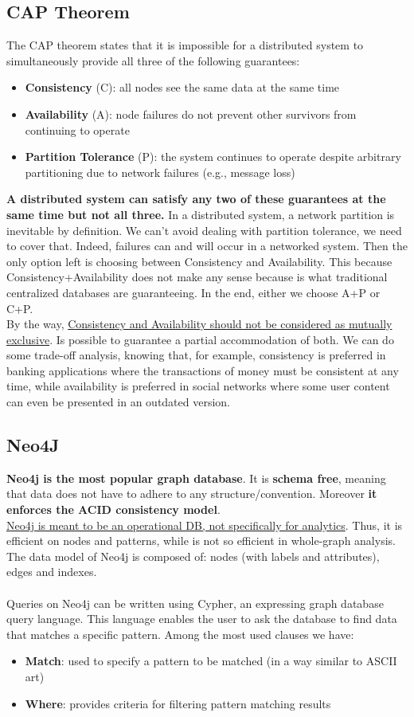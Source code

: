 \documentclass[10pt,a4paper]{article}
\newcommand{\nline}{\\~\\}
\begin{document}
\subsection{CAP Theorem}
The CAP theorem states that it is impossible for a distributed system to simultaneously provide all three of the following guarantees:
\begin{itemize}
	\item \textbf{Consistency} (C): all nodes see the same data at the same time 
	\item \textbf{Availability} (A): node failures do not prevent other survivors from continuing to operate
	\item \textbf{Partition Tolerance} (P): the system continues to operate despite arbitrary partitioning due to network failures (e.g., message loss)
\end{itemize}
\textbf{A distributed system can satisfy any two of these guarantees at the same time but not all three.} In a distributed system, a network partition is inevitable by definition. We can’t avoid dealing with partition tolerance, we need to cover that. Indeed, failures can and will occur in a networked system. Then the only option left is choosing between Consistency and Availability. This because Consistency+Availability does not make any sense because is what traditional centralized databases are guaranteeing. In the end, either we choose A+P or C+P.  \\
By the way, \uline{Consistency and Availability should not be considered as mutually exclusive}. Is possible to guarantee a partial accommodation of both. We can do some trade-off analysis, knowing that, for example, consistency is preferred in banking applications where the transactions of money must be consistent at any time, while availability is preferred in social networks where some user content can even be presented in an outdated version.
\subsection{Neo4J}
\textbf{Neo4j is the most popular graph database}. It is \textbf{schema free}, meaning that data does not have to adhere to any structure/convention. Moreover \textbf{it enforces the ACID consistency model}. \\ 
\uline{Neo4j is meant to be an operational DB, not specifically for analytics}. Thus, it is efficient on nodes and patterns, while is not so efficient in whole-graph analysis. The data model of Neo4j is composed of: nodes (with labels and attributes), edges and indexes.
\nline
Queries on Neo4j can be written using Cypher, an expressing graph database query language. This language enables the user to ask the database to find data that matches a specific pattern. Among the most used clauses we have: 
\begin{itemize}
	\item \textbf{Match}: used to specify a pattern to be matched (in a way similar to ASCII art)
	\item \textbf{Where}: provides criteria for filtering pattern matching results
\end{itemize}
\end{document}
